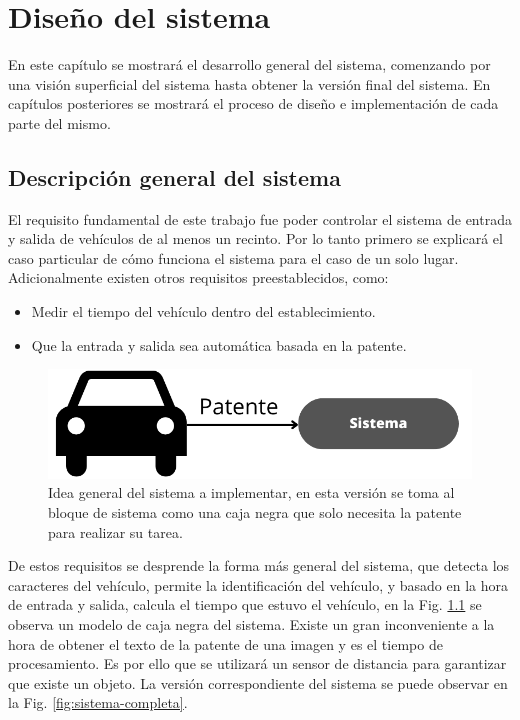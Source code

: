 \chapter{Diseño del sistema}

En este capítulo se mostrará el desarrollo general del sistema, comenzando por una visión superficial del sistema hasta obtener la versión final del sistema. En capítulos posteriores se mostrará el proceso de diseño e implementación de cada parte del mismo.

\section{Descripción general del sistema}

El requisito fundamental de este trabajo fue poder controlar el sistema de entrada y salida de vehículos de al menos un recinto. Por lo tanto primero se explicará el caso particular de cómo funciona el sistema para el caso de un solo lugar. Adicionalmente existen otros requisitos preestablecidos, como:

\begin{itemize}
    \item Medir el tiempo del vehículo dentro del establecimiento.
    \item Que la entrada y salida sea automática basada en la patente.
\end{itemize}

\begin{figure}[bth]
    \centering
    \includegraphics[width=.8\textwidth]{imgs/sistema-base.png}
    \caption[Modelo de caja negra del sistema.]{Idea general del sistema a implementar, en esta versión se toma al bloque de sistema como una caja negra que solo necesita la patente para realizar su tarea.}
    \label{fig:sistema-base}
\end{figure}

De estos requisitos se desprende la forma más general del sistema, que detecta los caracteres del vehículo, permite la identificación del vehículo, y basado en la hora de entrada y salida, calcula el tiempo que estuvo el vehículo, en la Fig. \ref{fig:sistema-base} se observa un modelo de caja negra del sistema.
Existe un gran inconveniente a la hora de obtener el texto de la patente de una imagen y es el tiempo de procesamiento. Es por ello que se utilizará un sensor de distancia para garantizar que existe un objeto.
La versión correspondiente del sistema se puede observar en la Fig. \ref{fig:sistema-completa}.

